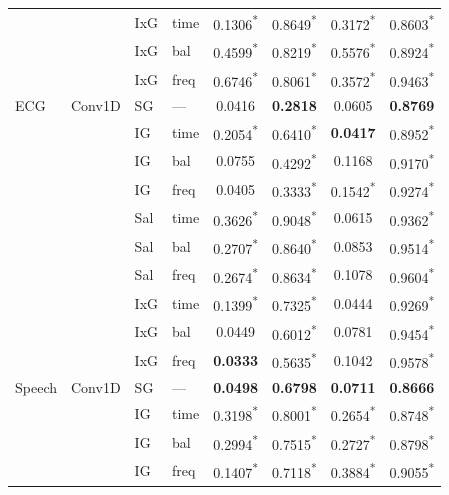 \begin{landscape}
\begin{table}[p]
\begin{tabular}{@{}llllcccc@{}}
 &  & IxG & time & 0.1306\textsuperscript{*} & 0.8649\textsuperscript{*} & 0.3172\textsuperscript{*} & 0.8603\textsuperscript{*} \\
 &  & IxG & bal & 0.4599\textsuperscript{*} & 0.8219\textsuperscript{*} & 0.5576\textsuperscript{*} & 0.8924\textsuperscript{*} \\
 &  & IxG & freq & 0.6746\textsuperscript{*} & 0.8061\textsuperscript{*} & 0.3572\textsuperscript{*} & 0.9463\textsuperscript{*} \\
\midrule
ECG & Conv1D & SG & --- & 0.0416 & \textbf{0.2818} & 0.0605 & \textbf{0.8769} \\
 &  & IG & time & 0.2054\textsuperscript{*} & 0.6410\textsuperscript{*} & \textbf{0.0417} & 0.8952\textsuperscript{*} \\
 &  & IG & bal & 0.0755 & 0.4292\textsuperscript{*} & 0.1168 & 0.9170\textsuperscript{*} \\
 &  & IG & freq & 0.0405 & 0.3333\textsuperscript{*} & 0.1542\textsuperscript{*} & 0.9274\textsuperscript{*} \\
 &  & Sal & time & 0.3626\textsuperscript{*} & 0.9048\textsuperscript{*} & 0.0615 & 0.9362\textsuperscript{*} \\
 &  & Sal & bal & 0.2707\textsuperscript{*} & 0.8640\textsuperscript{*} & 0.0853 & 0.9514\textsuperscript{*} \\
 &  & Sal & freq & 0.2674\textsuperscript{*} & 0.8634\textsuperscript{*} & 0.1078 & 0.9604\textsuperscript{*} \\
 &  & IxG & time & 0.1399\textsuperscript{*} & 0.7325\textsuperscript{*} & 0.0444 & 0.9269\textsuperscript{*} \\
 &  & IxG & bal & 0.0449 & 0.6012\textsuperscript{*} & 0.0781 & 0.9454\textsuperscript{*} \\
 &  & IxG & freq & \textbf{0.0333} & 0.5635\textsuperscript{*} & 0.1042 & 0.9578\textsuperscript{*} \\
\midrule
Speech & Conv1D & SG & --- & \textbf{0.0498} & \textbf{0.6798} & \textbf{0.0711} & \textbf{0.8666} \\
 &  & IG & time & 0.3198\textsuperscript{*} & 0.8001\textsuperscript{*} & 0.2654\textsuperscript{*} & 0.8748\textsuperscript{*} \\
 &  & IG & bal & 0.2994\textsuperscript{*} & 0.7515\textsuperscript{*} & 0.2727\textsuperscript{*} & 0.8798\textsuperscript{*} \\
 &  & IG & freq & 0.1407\textsuperscript{*} & 0.7118\textsuperscript{*} & 0.3884\textsuperscript{*} & 0.9055\textsuperscript{*} \\

\end{tabular}
\end{table}
\end{landscape}
